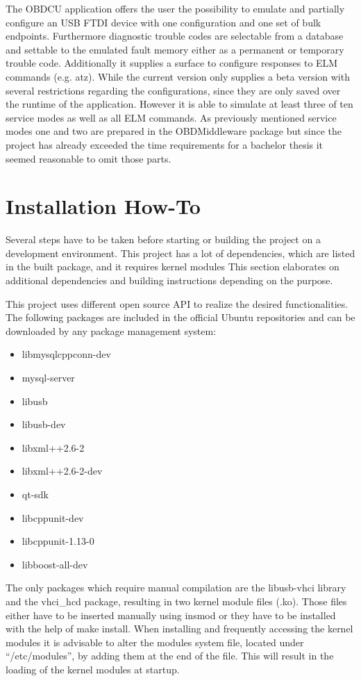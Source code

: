 The OBDCU application offers the user the possibility to emulate and partially configure an USB FTDI device with one configuration
and one set of bulk endpoints. Furthermore diagnostic trouble codes are selectable from a database and settable to the emulated 
fault memory either as a permanent or temporary trouble code. 
Additionally it supplies a surface to configure responses to ELM commands (e.g. atz). 
While the current version only supplies a beta version with several restrictions regarding the configurations, 
since they are only saved over the runtime of the application. 
However it is able to simulate at least three of ten service modes as well as all ELM commands. 
As previously mentioned service modes one and two are prepared in the OBDMiddleware package but since the project has already 
exceeded the time requirements for a bachelor thesis it seemed reasonable to omit those parts.

\section{Installation How-To}

Several steps have to be taken before starting or building the project on a development environment.
This project has a lot of dependencies, which are listed in the built package, and it requires kernel modules
This section elaborates on additional dependencies and building instructions depending on the purpose.

This project uses different open source API to realize the desired functionalities.
The following packages are included in the official Ubuntu repositories and can be downloaded by any package management system:

\begin{itemize}
 \item libmysqlcppconn-dev 
 \item mysql-server
 \item libusb 
 \item libusb-dev
 \item libxml++2.6-2 
 \item libxml++2.6-2-dev 
 \item qt-sdk
 \item libcppunit-dev 
 \item libcppunit-1.13-0 
 \item libboost-all-dev 
\end{itemize}

The only packages which require manual compilation are the libusb-vhci library and the vhci\_hcd package, 
resulting in two kernel module files (.ko). Those files either have to be inserted manually using insmod 
or they have to be installed with the help of make install. When installing and frequently accessing the 
kernel modules it is advisable to alter the modules system file, located under “/etc/modules”, by adding 
them at the end of the file. This will result in the loading of the kernel modules at startup.

